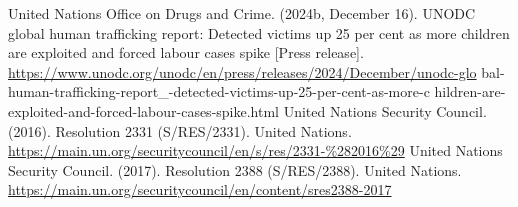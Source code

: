 \begin{referencelist}
   United Nations Office on Drugs and Crime. (2024b, December 16). UNODC global human trafficking report: Detected victims up 25 per cent as more children are exploited and forced labour cases spike [Press release]. \url{https://www.unodc.org/unodc/en/press/releases/2024/December/unodc-glo} bal-human-trafficking-report\_-detected-victims-up-25-per-cent-as-more-c hildren-are-exploited-and-forced-labour-cases-spike.html
   United Nations Security Council. (2016). Resolution 2331 (S/RES/2331). United Nations. \url{https://main.un.org/securitycouncil/en/s/res/2331-\%282016\%29}
   United Nations Security Council. (2017). Resolution 2388 (S/RES/2388). United Nations. \url{https://main.un.org/securitycouncil/en/content/sres2388-2017}
\end{referencelist}
